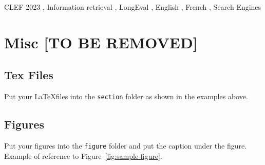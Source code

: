 \documentclass{ceurart}
\begin{document}
\begin{keywords}
  CLEF 2023 \sep
  Information retrieval \sep
  LongEval \sep
  English \sep
  French \sep
  Search Engines
\end{keywords}

\maketitle
















\iffalse
\section{Misc [TO BE REMOVED]}

\subsection{Tex Files}

Put your \LaTeX files into the \texttt{section} folder as shown in the examples above.

\subsection{Figures}

Put your figures into the \texttt{figure} folder and put the caption under the figure. Example of reference to Figure~\ref{fig:sample-figure}.
\end{document}
